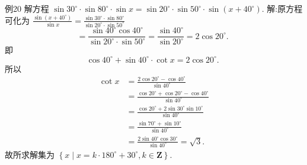 例20 解方程 $\sin 30^{\circ} \cdot \sin 80^{\circ} \cdot \sin x=\sin 20^{\circ} \cdot \sin 50^{\circ} \cdot \sin \left(x+40^{\circ}\right)$.
解:原方程可化为 $\frac{\sin \left(x+40^{\circ}\right)}{\sin x}=\frac{\sin 30^{\circ} \cdot \sin 80^{\circ}}{\sin 20^{\circ} \cdot \sin 50^{\circ}}$
$$
=\frac{\sin 40^{\circ} \cos 40^{\circ}}{\sin 20^{\circ} \cdot \sin 50^{\circ}}=\frac{\sin 40^{\circ}}{\sin 20^{\circ}}=2 \cos 20^{\circ} \text {. }
$$
即
$$
\cos 40^{\circ}+\sin 40^{\circ} \cdot \cot x=2 \cos 20^{\circ} \text {. }
$$
所以
$$
\begin{aligned}
\cot x & =\frac{2 \cos 20^{\circ}-\cos 40^{\circ}}{\sin 40^{\circ}} \\
& =\frac{\cos 20^{\circ}+\cos 20^{\circ}-\cos 40^{\circ}}{\sin 40^{\circ}} \\
& =\frac{\cos 20^{\circ}+2 \sin 30^{\circ} \sin 10^{\circ}}{\sin 40^{\circ}} \\
& =\frac{\sin 70^{\circ}+\sin 10^{\circ}}{\sin 40^{\circ}} \\
& =\frac{2 \sin 40^{\circ} \cos 30^{\circ}}{\sin 40^{\circ}}=\sqrt{3} .
\end{aligned}
$$
故所求解集为 $\left\{x \mid x=k \cdot 180^{\circ}+30^{\circ}, k \in \mathbf{Z}\right\}$.


